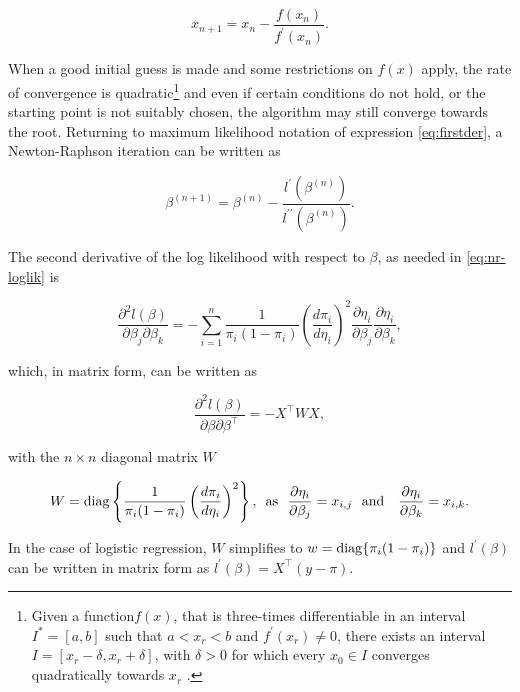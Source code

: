 \begin{equation}
  x_{n+1} = x_n - \frac{f(x_n)}{f^\prime(x_n)}.
\end{equation}

When a good initial guess is made and some restrictions on $f(x)$ apply, the rate of convergence is quadratic\footnote{Given a function$f(x)$, that is three-times differentiable in an interval $I^\ast= [a,b]$ such that $a < x_r < b$ and $f^\prime(x_r) \neq 0$, there exists an interval $I = [x_r-\delta, x_r+\delta]$, with $\delta > 0$ for which every $x_0 \in I$ converges quadratically towards $x_r$ \citep{Schwarz2006}.} and even if certain conditions do not hold, or the starting point is not suitably chosen, the algorithm may still converge towards the root. Returning to maximum likelihood notation of expression \ref{eq:firstder}, a Newton-Raphson iteration can be written as

\begin{equation}
  \beta^{(n+1)} = \beta^{(n)} - \frac{l^\prime(\beta^{(n)})}{l^{\prime\prime}(\beta^{(n)})}.\label{eq:nr-loglik}
\end{equation}

The second derivative of the log likelihood with respect to $\beta$, as needed in \ref{eq:nr-loglik} is

\begin{equation}
  \frac{\partial^2 l(\beta)}{\partial \beta_j\partial \beta_k} = -\sum_{i=1}^n \frac{1}{\pi_i (1-\pi_i)} \left(\frac{d \pi_i}{d \eta_i}\right)^2 \frac{\partial \eta_i}{\partial \beta_j} \frac{\partial \eta_i}{\partial \beta_k},
\end{equation}

which, in matrix form, can be written as

\begin{equation}
   \frac{\partial^2 l(\beta)}{\partial \beta\partial \beta^\intercal} = -X^\intercal W X,
\end{equation}

with the $n \times n$ diagonal matrix $W$

\begin{equation*}
  W = \diag\left\{\frac{1}{\pi_i (1-\pi_i)} \left(\frac{d \pi_i}{d \eta_i}\right)^2\right\} \text{,\ \ as\ \ } \frac{\partial \eta_i}{\partial \beta_j} = x_{i,j} \text{\ \ and \ \ } \frac{\partial \eta_i}{\partial \beta_k} = x_{i,k}.
\end{equation*}

In the case of logistic regression, $W$ simplifies to $w = \operatorname{diag}\{\pi_i (1-\pi_i)\}$ and $l^\prime(\beta)$ can be written in matrix form as $l^\prime(\beta) = X^\intercal (y - \pi)$.

